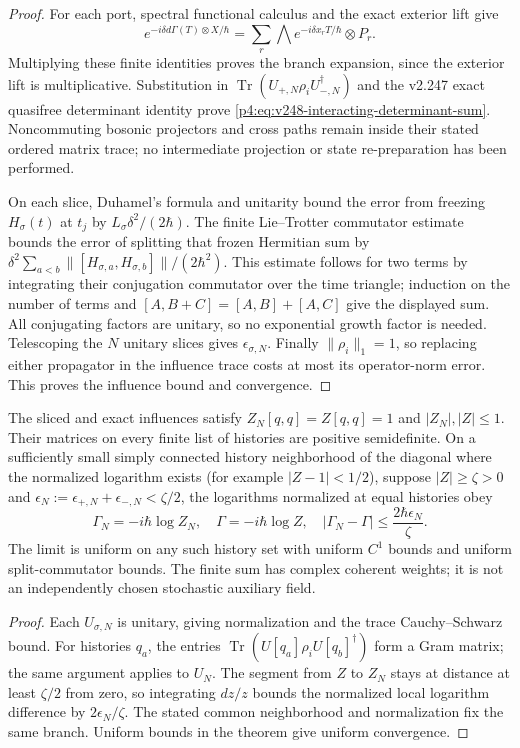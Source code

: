 \documentclass[12pt,a4paper]{article}
\begin{document}
\begin{proof}
For each port, spectral functional calculus and the exact exterior lift give
\[
 e^{-i\delta d\Gamma(T)\otimes X/\hbar}
 =\sum_r\bigwedge e^{-i\delta x_rT/\hbar}\otimes P_r.
\]
Multiplying these finite identities proves the branch expansion, since the
exterior lift is multiplicative. Substitution in
$\operatorname{Tr}(U_{+,N}\rho_iU_{-,N}^\dagger)$ and the v2.247 exact
quasifree determinant identity prove \eqref{p4:eq:v248-interacting-determinant-sum}.
Noncommuting bosonic projectors and cross paths remain inside their stated
ordered matrix trace; no intermediate projection or state re-preparation
has been performed.

On each slice, Duhamel's formula and unitarity bound the error from freezing
$H_\sigma(t)$ at $t_j$ by $L_\sigma\delta^2/(2\hbar)$.
The finite Lie--Trotter commutator estimate bounds the error of splitting
that frozen Hermitian sum by
$\delta^2\sum_{a<b}\|[H_{\sigma,a},H_{\sigma,b}]\|/(2\hbar^2)$.
This estimate follows for two terms by integrating their conjugation
commutator over the time triangle; induction on the number of terms and
$[A,B+C]=[A,B]+[A,C]$ give the displayed sum. All conjugating factors
are unitary, so no exponential growth factor is needed. Telescoping the
$N$ unitary slices gives $\epsilon_{\sigma,N}$.
Finally $\|\rho_i\|_1=1$, so replacing either propagator in the influence
trace costs at most its operator-norm error. This proves the influence
bound and convergence.
\end{proof}

\begin{corollary}
\label{p4:cor:v248-interacting-parent-error}
The sliced and exact influences satisfy $Z_N[q,q]=Z[q,q]=1$ and
$|Z_N|,|Z|\le1$. Their matrices on every finite list of histories are
positive semidefinite. On a sufficiently small simply connected history neighborhood of the
diagonal where the normalized logarithm exists (for example
$|Z-1|<1/2$), suppose $|Z|\ge\zeta>0$ and
$\epsilon_N:=\epsilon_{+,N}+\epsilon_{-,N}<\zeta/2$, the logarithms
normalized at equal histories obey
\[
 \boxed{\Gamma_N=-i\hbar\log Z_N,\quad
 \Gamma=-i\hbar\log Z,\quad
 |\Gamma_N-\Gamma|\le\frac{2\hbar\epsilon_N}{\zeta}.}
\]
The limit is uniform on any such history set with uniform $C^1$ bounds and
uniform split-commutator bounds. The finite sum has complex coherent
weights; it is not an independently chosen stochastic auxiliary field.
\end{corollary}
\begin{proof}
Each $U_{\sigma,N}$ is unitary, giving normalization and the trace
Cauchy--Schwarz bound. For histories $q_a$, the entries
$\operatorname{Tr}(U[q_a]\rho_iU[q_b]^\dagger)$ form a Gram matrix;
the same argument applies to $U_N$. The segment from $Z$ to $Z_N$ stays
at distance at least $\zeta/2$ from zero, so integrating $dz/z$ bounds
the normalized local logarithm difference by $2\epsilon_N/\zeta$.
The stated common neighborhood and normalization fix the same branch.
Uniform bounds in the theorem give uniform convergence.
\end{proof}
\end{document}
